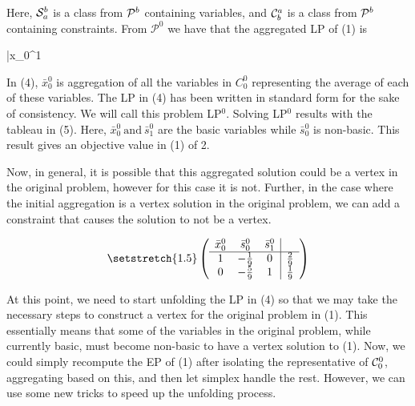 \documentclass[11pt]{article} %
\newcommand{\cP}{{\cal P}}
\newcommand{\cC}{{\cal C}}
\newcommand{\cS}{{\cal S}}
\begin{document}
	 Here, $\cS_a^b$ is a class from $\cP^b$ containing variables, and $\cC_b^a$ is a class from $\cP^b$ containing constraints.  From $\mathcal{P}^0$ we have that the aggregated LP of (1) is  
 
 \begin{mini!}
 	{}{\bar{x}_0^1}{}{}
 \end{mini!}

	In (4), $\bar{x}_0^0$ is aggregation of all the variables in $C_0^0$ representing the average of each of these variables.  The LP in (4) has been written in standard form for the sake of consistency. We will call this problem LP$^0$. Solving LP$^0$ results with the tableau in (5).  Here, $\bar{x}_0^0 \ \text{and} \ \bar{s}_1^0$ are the basic variables while $\bar{s}_0^0$ is non-basic.  This result gives an objective value in (1) of 2.
	
	Now, in general, it is possible that this aggregated solution could be a vertex in the original problem, however for this case it is not.  Further, in the case where the initial aggregation is a vertex solution in the original problem, we can add a constraint that causes the solution to not be a vertex.
	
	\begin{equation}\setstretch{1.5}
	\begin{pmatrix}
	\begin{array}{ccc|c}
		\bar{x}_0^0 & \bar{s}_0^0 & \bar{s}_1^0 \\
		\hline
		1 & -\frac{1}{9} & 0 & \frac{2}{9} \\
		0 & -\frac{5}{9} & 1 & \frac{1}{9} 
	\end{array}
	\end{pmatrix}
	\end{equation}
	
	At this point, we need to start unfolding the LP in (4) so that we may take the necessary steps to construct a vertex for the original problem in (1).  This essentially means that some of the variables in the original problem, while currently basic, must become non-basic to have a vertex solution to (1).  Now, we could simply recompute the EP of (1) after isolating the representative of $\cC_0^0$, aggregating based on this, and then let simplex handle the rest.  However, we can use some new tricks to speed up the unfolding process.
	
\end{document}
